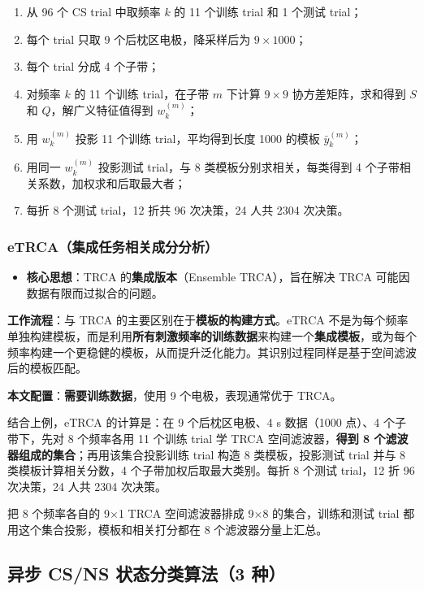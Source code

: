 \documentclass[12pt, a4paper]{ctexart}
\begin{document}
\begin{enumerate}
  \item 从 96 个 CS trial 中取频率 $k$ 的 11 个训练 trial 和 1 个测试 trial；
  \item 每个 trial 只取 9 个后枕区电极，降采样后为 $9\times1000$；
  \item 每个 trial 分成 4 个子带；
  \item 对频率 $k$ 的 11 个训练 trial，在子带 $m$ 下计算 $9\times9$ 协方差矩阵，求和得到 $S$ 和 $Q$，解广义特征值得到 $w_k^{(m)}$；
  \item 用 $w_k^{(m)}$ 投影 11 个训练 trial，平均得到长度 1000 的模板 $\bar{y}_k^{(m)}$；
  \item 用同一 $w_k^{(m)}$ 投影测试 trial，与 8 类模板分别求相关，每类得到 4 个子带相关系数，加权求和后取最大者；
  \item 每折 8 个测试 trial，12 折共 96 次决策，24 人共 2304 次决策。
\end{enumerate}

\subsubsection*{eTRCA（集成任务相关成分分析）}

\begin{itemize}
  \item \textbf{核心思想}：TRCA 的\textbf{集成版本}（Ensemble TRCA），旨在解决 TRCA 可能因数据有限而过拟合的问题。
\end{itemize}

\textbf{工作流程}：与 TRCA 的主要区别在于\textbf{模板的构建方式}。eTRCA 不是为每个频率单独构建模板，而是利用\textbf{所有刺激频率的训练数据}来构建一个\textbf{集成模板}，或为每个频率构建一个更稳健的模板，从而提升泛化能力。其识别过程同样是基于空间滤波后的模板匹配。

\textbf{本文配置}：\textbf{需要训练数据}，使用 9 个电极，表现通常优于 TRCA。

结合上例，eTRCA 的计算是：在 9 个后枕区电极、4 s 数据（1000 点）、4 个子带下，先对 8 个频率各用 11 个训练 trial 学 TRCA 空间滤波器，\textbf{得到 8 个滤波器组成的集合}；再用该集合投影训练 trial 构造 8 类模板，投影测试 trial 并与 8 类模板计算相关分数，4 个子带加权后取最大类别。每折 8 个测试 trial，12 折 96 次决策，24 人共 2304 次决策。

把 8 个频率各自的 9$\times$1 TRCA 空间滤波器排成 9$\times$8 的集合，训练和测试 trial 都用这个集合投影，模板和相关打分都在 8 个滤波器分量上汇总。

\subsection{异步 CS/NS 状态分类算法（3 种）}
\end{document}
